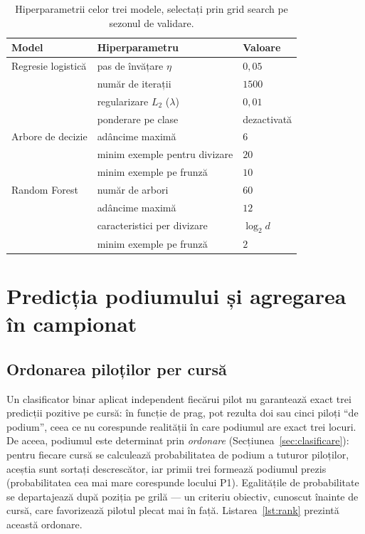 \documentclass[12pt,a4paper]{report}
\begin{document}
\begin{table}[htbp]
  \centering
  \begin{tabular}{l l l}
    \toprule
    \textbf{Model} & \textbf{Hiperparametru} & \textbf{Valoare} \\
    \midrule
    Regresie logistică & pas de învățare $\eta$           & $0{,}05$ \\
                       & număr de iterații                & $1500$ \\
                       & regularizare $L_2$ ($\lambda$)   & $0{,}01$ \\
                       & ponderare pe clase               & dezactivată \\
    \midrule
    Arbore de decizie  & adâncime maximă                  & $6$ \\
                       & minim exemple pentru divizare    & $20$ \\
                       & minim exemple pe frunză          & $10$ \\
    \midrule
    Random Forest      & număr de arbori                  & $60$ \\
                       & adâncime maximă                  & $12$ \\
                       & caracteristici per divizare      & $\log_2 d$ \\
                       & minim exemple pe frunză          & $2$ \\
    \bottomrule
  \end{tabular}
  \caption{Hiperparametrii celor trei modele, selectați prin grid search pe sezonul de validare.}
  \label{tab:hiperparametri}
\end{table}

\section{Predicția podiumului și agregarea în campionat}
\label{sec:predictie}

\subsection{Ordonarea piloților per cursă}

Un clasificator binar aplicat independent fiecărui pilot nu garantează exact trei predicții
pozitive pe cursă: în funcție de prag, pot rezulta doi sau cinci piloți ``de podium'', ceea ce nu
corespunde realității în care podiumul are exact trei locuri. De aceea, podiumul este determinat
prin \emph{ordonare} (Secțiunea~\ref{sec:clasificare}): pentru fiecare cursă se calculează
probabilitatea de podium a tuturor piloților, aceștia sunt sortați descrescător, iar primii trei
formează podiumul prezis (probabilitatea cea mai mare corespunde locului P1). Egalitățile de
probabilitate se departajează după poziția pe grilă --- un criteriu obiectiv, cunoscut înainte de
cursă, care favorizează pilotul plecat mai în față. Listarea~\ref{lst:rank} prezintă această
ordonare.
\end{document}
